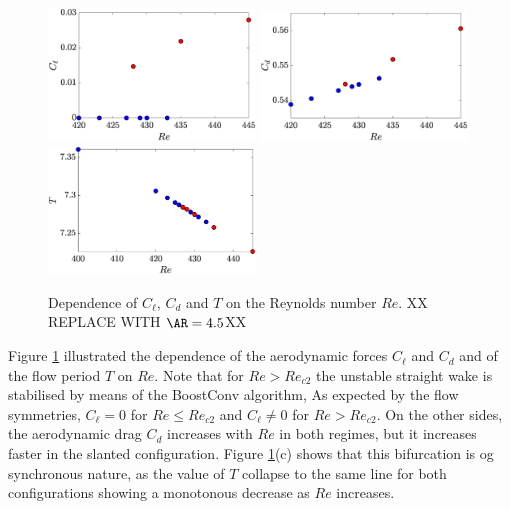 \begin{figure}
  \centering
  \includegraphics[width=0.49\textwidth]{./fig/AR4_Cl_Re.eps}
  \includegraphics[width=0.49\textwidth]{./fig/AR4_Cd_Re.eps}
  \includegraphics[width=0.49\textwidth]{./fig/AR4_T_Re.eps}
  \caption{Dependence of $C_\ell$, $C_d$ and $T$ on the Reynolds number $Re$. XX REPLACE WITH $\AR=4.5$XX}
  \label{fig:Cl-Cd-AR4}
\end{figure}
%
Figure \ref{fig:Cl-Cd-AR4} illustrated the dependence of the aerodynamic forces $C_\ell$ and $C_d$ and of the flow period $T$ on $Re$. Note that for $Re>Re_{c2}$ the unstable straight wake is stabilised by means of the BoostConv algorithm, As expected by the flow symmetries, $C_\ell=0$ for $Re \le Re_{c2}$ and $C_\ell \neq 0$ for $Re > Re_{c2}$. On the other sides, the aerodynamic drag $C_d$ increases with $Re$ in both regimes, but it increases faster in the slanted configuration. Figure \ref{fig:Cl-Cd-AR4}(c) shows that this bifurcation is og synchronous nature, as the value of $T$ collapse to the same line for both configurations showing a monotonous decrease as $Re$ increases.

